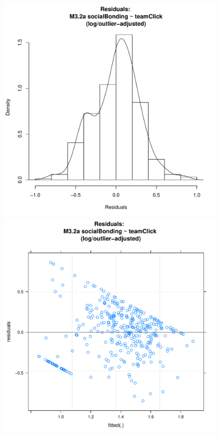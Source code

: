 \documentclass[12pt]{report}
\begin{document}
{\begin{figure}[htbp]
  \includegraphics[scale =.4]{../images/MLM32aOutLogHist.pdf}
  \includegraphics[scale =.4]{../images/MLM32aOutLogScatter.pdf}

\end{figure}}
\end{document}
